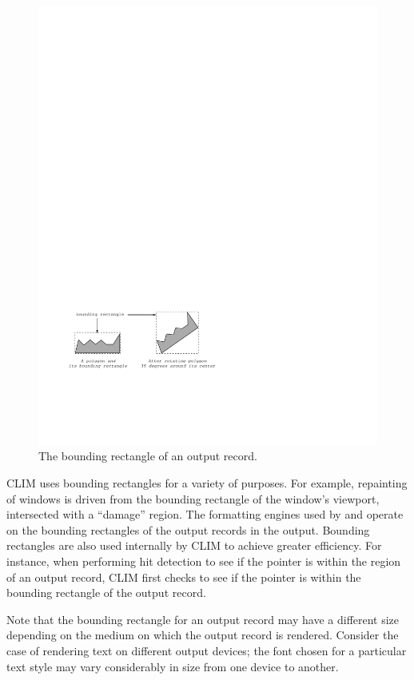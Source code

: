 \begin{figure}
\centerline{\includegraphics{bounding-box}}
\caption{\label{output-record-bbox} The bounding rectangle of an output record.}
\end{figure}

CLIM uses bounding rectangles for a variety of purposes.  For example,
repainting of windows is driven from the bounding rectangle of the window's
viewport, intersected with a ``damage'' region.  The formatting engines used by
 and  operate on the bounding
rectangles of the output records in the output.  Bounding rectangles are also
used internally by CLIM to achieve greater efficiency.  For instance, when
performing hit detection to see if the pointer is within the region of an output
record, CLIM first checks to see if the pointer is within the bounding rectangle
of the output record.

Note that the bounding rectangle for an output record may have a different size
depending on the medium on which the output record is rendered.  Consider the
case of rendering text on different output devices; the font chosen for a
particular text style may vary considerably in size from one device to another.

